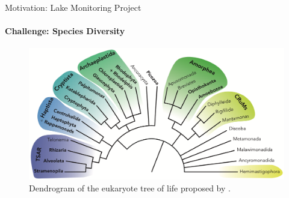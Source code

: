 \documentclass[xcolor=dvipsnames,envcountsect]{beamer}
\begin{document}
\begin{frame}{Motivation: Lake Monitoring Project}
\framesubtitle{Challenge: Species Diversity}
\begin{figure}
    \includegraphics[scale=.6]{eTOL2}
    \caption{Dendrogram of the eukaryote tree of life proposed by \cite{Burki2020}.}
\end{figure}
\end{frame}
\end{document}
